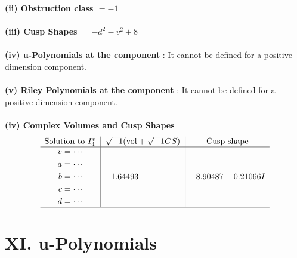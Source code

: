 \documentclass[1p]{elsarticle_modified}
\theoremstyle{definition}
\newcommand{\I}{\sqrt{-1}}
\begin{document}
\flushleft \textbf{(ii) Obstruction class $= -1$}\\~\\
\flushleft \textbf{(iii) Cusp Shapes $= - d^2- v^2+8$}\\~\\
\flushleft \textbf{(iv) u-Polynomials at the component} : It cannot be defined for a positive dimension component.\\~\\
\flushleft \textbf{(v) Riley Polynomials at the component} : It cannot be defined for a positive dimension component.\\~\\
\newpage\flushleft \textbf{(iv) Complex Volumes and Cusp Shapes}
$$\begin{array}{c|c|c} 
\text{Solution to }I^v_{4}& \I (\text{vol} + \sqrt{-1}CS) & \text{Cusp shape}\\
 \hline 
\begin{aligned}
v &= \cdots \\
a &= \cdots \\
b &= \cdots \\
c &= \cdots \\
d &= \cdots\end{aligned}
 & \phantom{-}1.64493\phantom{ +0.000000I} & \phantom{-}8.90487 - 0.21066 I\\
 \hline 
 \end{array}
$$
\newpage\renewcommand{\arraystretch}{1}
\centering \section*{ XI. u-Polynomials}
\end{document}
